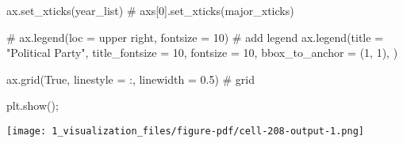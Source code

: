 \documentclass[
  letterpaper,
  DIV=11,
  numbers=noendperiod]{scrartcl}
\newenvironment{Shaded}{\begin{snugshade}}{\end{snugshade}}
\newcommand{\CommentTok}[1]{\textcolor[rgb]{0.37,0.37,0.37}{#1}}
\newcommand{\DecValTok}[1]{\textcolor[rgb]{0.68,0.00,0.00}{#1}}
\newcommand{\FloatTok}[1]{\textcolor[rgb]{0.68,0.00,0.00}{#1}}
\newcommand{\NormalTok}[1]{\textcolor[rgb]{0.00,0.23,0.31}{#1}}
\newcommand{\OperatorTok}[1]{\textcolor[rgb]{0.37,0.37,0.37}{#1}}
\newcommand{\StringTok}[1]{\textcolor[rgb]{0.13,0.47,0.30}{#1}}
\newcommand{\VariableTok}[1]{\textcolor[rgb]{0.07,0.07,0.07}{#1}}
\begin{document}
\begin{Shaded}
\begin{Highlighting}[]
\NormalTok{ax.set\_xticks(year\_list)}
\CommentTok{\# axs[0].set\_xticks(major\_xticks)}

\CommentTok{\# ax.legend(loc = \textquotesingle{}upper right\textquotesingle{}, fontsize = 10) \# add legend}
\NormalTok{ax.legend(title }\OperatorTok{=} \StringTok{"Political Party"}\NormalTok{,}
\NormalTok{          title\_fontsize }\OperatorTok{=} \DecValTok{10}\NormalTok{, fontsize }\OperatorTok{=} \DecValTok{10}\NormalTok{,}
\NormalTok{          bbox\_to\_anchor }\OperatorTok{=}\NormalTok{ (}\DecValTok{1}\NormalTok{, }\DecValTok{1}\NormalTok{), }
\NormalTok{          )}


\NormalTok{ax.grid(}\VariableTok{True}\NormalTok{, linestyle }\OperatorTok{=} \StringTok{\textquotesingle{}:\textquotesingle{}}\NormalTok{, linewidth }\OperatorTok{=} \FloatTok{0.5}\NormalTok{) }\CommentTok{\# grid}

\NormalTok{plt.show()}\OperatorTok{;}
\end{Highlighting}
\end{Shaded}

\texttt{[image: 1\_visualization\_files/figure-pdf/cell-208-output-1.png]}
\end{document}
